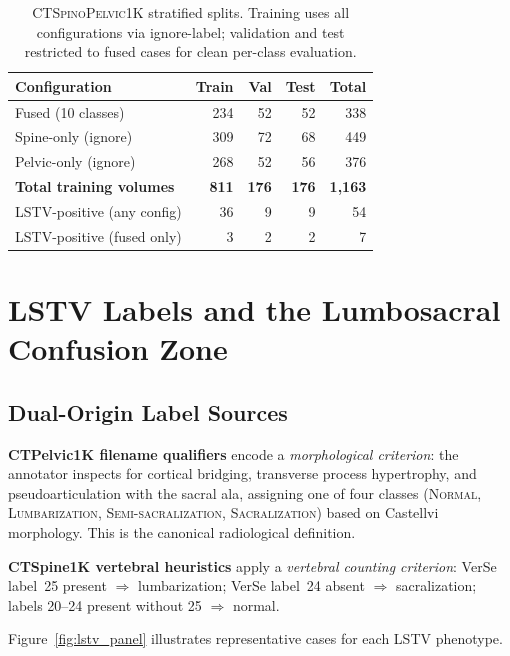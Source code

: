 \documentclass[pmlr]{jmlr}
\newcommand{\dataset}{\textsc{CTSpinoPelvic1K}}
\begin{document}
\begin{table}[t]
  {\caption{\dataset{} stratified splits.
    Training uses all configurations via ignore-label; validation
    and test restricted to fused cases for clean per-class
    evaluation.}}
  {\small\begin{tabular}{lrrrr}
  \toprule
  \bfseries Configuration & Train & Val & Test & Total \\
  \midrule
  Fused (10 classes)     & 234 & 52 & 52 & 338 \\
  Spine-only (ignore)    & 309 & 72 & 68 & 449 \\
  Pelvic-only (ignore)   & 268 & 52 & 56 & 376 \\
  \midrule
  \textbf{Total training volumes} & \textbf{811} & \textbf{176} & \textbf{176} & \textbf{1{,}163} \\
  \midrule
  LSTV-positive (any config)   & 36 & 9 & 9 & 54 \\
  LSTV-positive (fused only)   & 3 & 2 & 2 & 7 \\
  \bottomrule
  \end{tabular}}
\end{table}

\section{LSTV Labels and the Lumbosacral Confusion Zone}
\label{sec:lstv_arbitration}

\subsection{Dual-Origin Label Sources}

\textbf{CTPelvic1K filename qualifiers} encode a
\emph{morphological criterion}: the annotator inspects for cortical
bridging, transverse process hypertrophy, and pseudoarticulation
with the sacral ala, assigning one of four classes (\textsc{Normal},
\textsc{Lumbarization}, \textsc{Semi-sacralization},
\textsc{Sacralization}) based on Castellvi morphology.
This is the canonical radiological definition.

\textbf{CTSpine1K vertebral heuristics} apply a
\emph{vertebral counting criterion}: VerSe label~25 present
$\Rightarrow$ lumbarization; VerSe label~24 absent $\Rightarrow$
sacralization; labels 20--24 present without 25 $\Rightarrow$ normal.

Figure~\ref{fig:lstv_panel} illustrates representative cases for
each LSTV phenotype.
\end{document}
